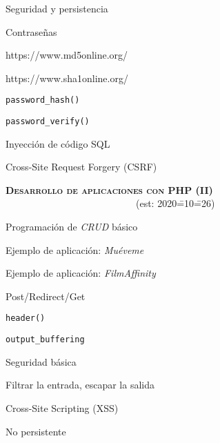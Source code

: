 \begin{longenum}
\begin{longenum}
        \item Seguridad y persistencia
        \begin{longenum}
            \item Contraseñas
            \begin{longenum}
                \item https://www.md5online.org/
                \item https://www.sha1online.org/
                \item \texttt{password\_hash()}
                \item \texttt{password\_verify()}
            \end{longenum}
            \item Inyección de código SQL
            \item Cross-Site Request Forgery (CSRF)
        \end{longenum}
    \end{longenum}
    \item \textbf{\textsc{Desarrollo de aplicaciones con PHP (II)}} \ \ \ \ \ \ \ \ \ \ \ \ \ \ \ \ \ \ \ \ \ \ \ \ \ \ \ (est: 2020\==10\==26)
    \begin{longenum}
        \item Programación de \textit{CRUD} básico
        \begin{longenum}
            \item Ejemplo de aplicación: \textit{Muéveme}
            \item Ejemplo de aplicación: \textit{FilmAffinity}
        \end{longenum}
        \item Post/Redirect/Get
        \item \texttt{header()}
        \begin{longenum}
            \item \texttt{output\_buffering}
        \end{longenum}
        \item Seguridad básica
        \begin{longenum}
            \item Filtrar la entrada, escapar la salida
            \item Cross-Site Scripting (XSS)
            \begin{longenum}
                \item No persistente

\end{longenum}
\end{longenum}
\end{longenum}
\end{longenum}
